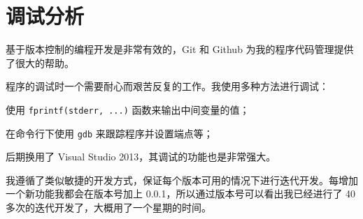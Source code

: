 \section{调试分析}

基于版本控制的编程开发是非常有效的，Git 和 Github 为我的程序代码管理提供了很大的帮助。

程序的调试时一个需要耐心而艰苦反复的工作。我使用多种方法进行调试：
\begin{description}[labelindent=3em,labelwidth=3em]
\item[静态] 使用 \verb|fprintf(stderr, ...)| 函数来输出中间变量的值；
\item[GDB] 在命令行下使用 \verb|gdb| 来跟踪程序并设置端点等；
\item[IDE] 后期换用了 Visual Studio 2013，其调试的功能也是非常强大。
\end{description}

我遵循了类似敏捷的开发方式，保证每个版本可用的情况下进行迭代开发。每增加一个新功能我都会在版本号加上 0.0.1，所以通过版本号可以看出我已经进行了 40 多次的迭代开发了，大概用了一个星期的时间。

